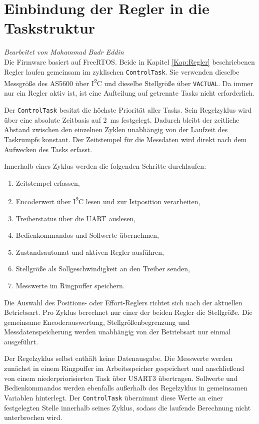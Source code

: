 \section{Einbindung der Regler in die Taskstruktur}
\label{sec:taskeinbindung}
\textit{Bearbeitet von Mohammad Badr Eddin}\\
Die Firmware basiert auf FreeRTOS. Beide in Kapitel \ref{Kap:Regler}
beschriebenen Regler laufen gemeinsam im zyklischen
\texttt{ControlTask}. Sie verwenden dieselbe Messgröße des AS5600 über
I\textsuperscript{2}C und dieselbe Stellgröße über \texttt{VACTUAL}.
Da immer nur ein Regler aktiv ist, ist eine Aufteilung auf getrennte
Tasks nicht erforderlich.

Der \texttt{ControlTask} besitzt die höchste Priorität aller Tasks.
Sein Regelzyklus wird über eine absolute Zeitbasis auf
\SI{2}{\milli\second} festgelegt. Dadurch bleibt der zeitliche Abstand
zwischen den einzelnen Zyklen unabhängig von der Laufzeit des
Taskrumpfs konstant. Der Zeitstempel für die Messdaten wird direkt
nach dem Aufwecken des Tasks erfasst.

Innerhalb eines Zyklus werden die folgenden Schritte durchlaufen:

\begin{enumerate}
    \item Zeitstempel erfassen,
    \item Encoderwert über I\textsuperscript{2}C lesen und zur
          Istposition verarbeiten,
    \item Treiberstatus über die UART auslesen,
    \item Bedienkommandos und Sollwerte übernehmen,
    \item Zustandsautomat und aktiven Regler ausführen,
    \item Stellgröße als Sollgeschwindigkeit an den Treiber senden,
    \item Messwerte im Ringpuffer speichern.
\end{enumerate}

Die Auswahl des Positions- oder Effort-Reglers richtet sich nach der
aktuellen Betriebsart. Pro Zyklus berechnet nur einer der beiden
Regler die Stellgröße. Die gemeinsame Encoderauswertung,
Stellgrößenbegrenzung und Messdatenspeicherung werden unabhängig von
der Betriebsart nur einmal ausgeführt.

Der Regelzyklus selbst enthält keine Datenausgabe. Die Messwerte
werden zunächst in einem Ringpuffer im Arbeitsspeicher gespeichert
und anschließend von einem niederpriorisierten Task über USART3
übertragen. Sollwerte und Bedienkommandos werden ebenfalls außerhalb
des Regelzyklus in gemeinsamen Variablen hinterlegt. Der
\texttt{ControlTask} übernimmt diese Werte an einer festgelegten
Stelle innerhalb seines Zyklus, sodass die laufende Berechnung nicht
unterbrochen wird.

